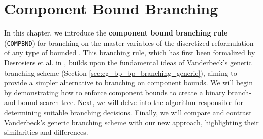 \chapter{Component Bound Branching}\label{ch:cmpbnd}
In this chapter, we introduce the \textbf{component bound branching rule} (\texttt{COMPBND}) for branching on the master variables of the discretized reformulation of any type of bounded \IP{}. This branching rule, which has first been formalized by Desrosiers et al. in \cite{thebook}, builds upon the fundamental ideas of Vanderbeck's generic branching scheme (Section \ref{sec:cg_bp_bp_branching_generic}), aiming to provide a simpler alternative to branching on component bounds. We will begin by demonstrating how to enforce component bounds to create a binary branch-and-bound search tree. Next, we will delve into the algorithm responsible for determining suitable branching decisions. Finally, we will compare and contrast Vanderbeck's generic branching scheme with our new approach, highlighting their similarities and differences.




